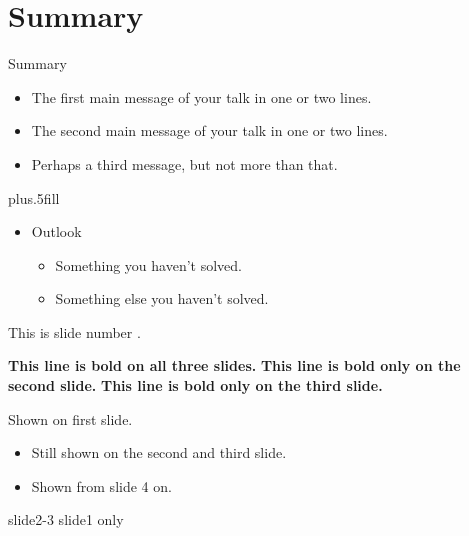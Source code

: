 \documentclass{beamer}
\begin{document}
\section*{Summary}

\begin{frame}{Summary}

  \begin{itemize}
  \item
    The \alert{first main message} of your talk in one or two lines.
  \item
    The \alert{second main message} of your talk in one or two lines.
  \item
    Perhaps a \alert{third message}, but not more than that.
  \end{itemize}
  
  \vskip0pt plus.5fill
  \begin{itemize}
  \item
    Outlook
    \begin{itemize}
    \item
      Something you haven't solved.
    \item
      Something else you haven't solved.
    \end{itemize}
  \end{itemize}
\end{frame}

\begin{frame}
  This is slide number %
  .%
\end{frame}

\begin{frame}
       \textbf{This line is bold on all three slides.}
       \textbf<2>{This line is bold only on the second slide.}
       \textbf<3>{This line is bold only on the third slide.}
\end{frame}

\begin{frame}
      Shown on first slide.
      \begin{itemize}
      \item
        Still shown on the second and third slide.
      \item
        Shown from slide 4 on.
      \end{itemize}
   slide2-3
       slide1 only
 \end{frame}

\begin{frame}
\end{frame}
\end{document}
